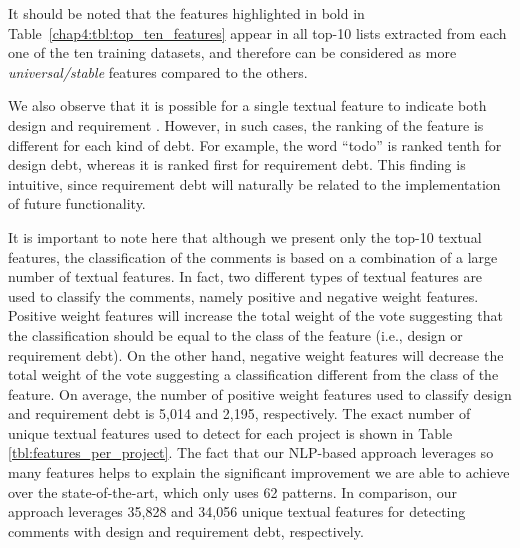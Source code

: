 It should be noted that the features highlighted in bold in Table~\ref{chap4:tbl:top_ten_features} appear in all top-10 lists extracted from each one of the ten training datasets, and therefore can be considered as more \textit{universal/stable} features compared to the others.

We also observe that it is possible for a single textual feature to indicate both design and requirement \SATD. However, in such cases, the ranking of the feature is different for each kind of debt. For example, the word ``todo'' is ranked tenth for design debt, whereas it is ranked first for requirement debt. This finding is intuitive, since requirement debt will naturally be related to the implementation of future functionality.

It is important to note here that although we present only the top-10 textual features, the classification of the comments is based on a combination of a large number of textual features. In fact, two different types of textual features are used to classify the comments, namely positive and negative weight features. Positive weight features will increase the total weight of the vote suggesting that the classification should be equal to the class of the feature (i.e., design or requirement debt). On the other hand, negative weight features will decrease the total weight of the vote suggesting a classification different from the class of the feature. On average, the number of positive weight features used to classify design and requirement debt is 5,014 and 2,195, respectively. The exact number of unique textual features used to detect \SATD for each project is shown in Table \ref{tbl:features_per_project}. The fact that our NLP-based approach leverages so many features helps to explain the significant improvement we are able to achieve over the state-of-the-art, which only uses 62 patterns. In comparison, our approach leverages 35,828 and 34,056 unique textual features for detecting comments with design and requirement debt, respectively.

